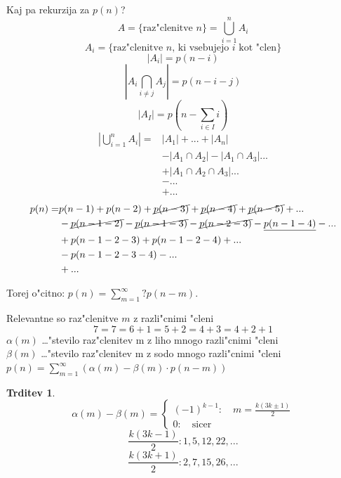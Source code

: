 \documentclass[a4paper,12pt]{article}
\theoremstyle{definition}
\newtheorem{claim}[counter]{Trditev}
\theoremstyle{remark}
\begin{document}
Kaj pa rekurzija za $p(n)$?
\[A = \{\text{raz"clenitve }n\} = \bigcup_{i = 1}^n A_i\]
\[A_i = \{\text{raz"clenitve }n\text{, ki vsebujejo }i\text{ kot "clen}\}\]
\[|A_i| = p(n - i)\]
\[|A_i \bigcap_{i \neq j} A_j| = p(n - i - j)\]
\[|A_I| = p(n - \sum_{i \in I} i)\]
\begin{align}
	|\bigcup_{i = 1}^n A_i| = & |A_1| + ... + |A_n|\nonumber\\
    			& - |A_1 \cap A_2| - |A_1 \cap A_3| ...\nonumber\\
                & + |A_1 \cap A_2 \cap A_3| ...\nonumber\\
                & - ...\nonumber\\
                & + ...\nonumber
\end{align}
\label{TODO: tukej pogresam malo texta}
\begin{align}
	p(n) = & p(n - 1) + p(n - 2) + \cancel{p(n - 3)} + \cancel{p(n - 4)} + \cancel{p(n - 5)} + ...\nonumber\\
    	& - \cancel{p(n - 1 - 2)} - \cancel{p(n - 1 - 3)} - \cancel{p(n - 2 - 3)} - \underline{p(n - 1 - 4)} - ...\nonumber\\
        & + p(n - 1 - 2 - 3) + p(n - 1 - 2 - 4) + ...\nonumber\\
        & - p(n - 1 - 2 - 3 - 4) - ...\nonumber\\
        & + ...\nonumber
\end{align}

Torej o"citno: $p(n) = \displaystyle\sum_{m=1}^{\infty} ? p(n - m)$.

Relevantne so raz"clenitve $m$ z razli"cnimi "cleni
\[7 = 7 = 6 + 1 = 5 + 2 = 4 + 3 = 4 + 2 + 1\]
$\alpha(m)$ \ldots "stevilo raz"clenitev m z liho mnogo razli"cnimi "cleni\\
$\beta(m)$ \ldots "stevilo raz"clenitev m z sodo mnogo razli"cnimi "cleni\\
$p(n) = \sum_{m = 1}^{\infty} (\alpha(m) - \beta (m)\cdot p(n - m))$

\begin{claim}
\[\alpha(m) - \beta(m) = \begin{cases}(-1)^{k - 1}: \quad m = \frac{k (3k \pm 1)}{2}  \\ 0: \quad \text{sicer} \end{cases}\]
\[\frac{k (3k - 1)}{2}: 1, 5, 12, 22, ...\]
\[\frac{k (3k + 1)}{2}: 2, 7, 15, 26, ...\]
\end{claim}
\end{document}
